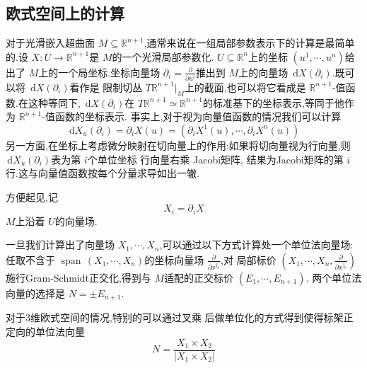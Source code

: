 \documentclass[../../几何与拓扑.tex]{subfiles}
\begin{document}
\subsection{欧式空间上的计算}


对于光滑嵌入超曲面 \(  M\subseteq \mathbb{R} ^{n+ 1}  \),通常来说在一组局部参数表示下的计算是最简单的.设 \(  X:U\to \mathbb{R} ^{n+ 1}  \)是 \(  M  \)的一个光滑局部参数化.  \(  U\subseteq \mathbb{R} ^{n}  \)上的坐标 \(  \left(  u^1,\cdots,u^n  \right)   \)给出了 \(  M  \)上的一个局坐标.坐标向量场 \(   \partial _{i}= \frac{\partial }{\partial u^{i}}  \)推出到 \(  M  \)上的向量场 \(  \,\mathrm{d} X\left(  \partial _{i} \right)   \).既可以将 \(  \,\mathrm{d} X\left(  \partial _{i} \right)   \)看作是 限制切丛 \(  T\mathbb{R} ^{n+ 1}|_{M}  \)上的截面,也可以将它看成是 \(  \mathbb{R} ^{n+ 1}  \)-值函数.在这种等同下, \(  \,\mathrm{d} X\left(  \partial _{i} \right)   \)在 \(  T\mathbb{R} ^{n+ 1}\simeq \mathbb{R} ^{n+ 1}  \)的标准基下的坐标表示,等同于他作为 \(  \mathbb{R} ^{n+ 1}  \)-值函数的坐标表示.  事实上,对于视为向量值函数的情况我们可以计算 \[
\,\mathrm{d} X_{u}\left(  \partial _{i} \right)=   \partial _{i}X\left( u \right)= \left(  \partial _{i}X^{1}\left( u \right),\cdots , \partial _{i}X^{n}\left( u \right)   \right)   
\]      
另一方面,在坐标上考虑微分映射在切向量上的作用:如果将切向量视为行向量,则 \(  \,\mathrm{d} X_{u}\left(  \partial _{i} \right)   \)表为第 \(  i  \)个单位坐标 行向量右乘 Jacobi矩阵, 结果为Jacobi矩阵的第 \(  i  \)行.这与向量值函数按每个分量求导如出一辙.
\begin{definition}
    方便起见,记 \[
    X_{i}=  \partial _{i}X
    \] \(  M  \)上沿着 \(  U  \)的向量场.  
\end{definition}

一旦我们计算出了向量场 \(   X_1,\cdots,X_n   \),可以通过以下方式计算处一个单位法向量场: 任取不含于 \(  \operatorname{span}\,\left(  X_1,\cdots,X_n  \right)   \)的坐标向量场 \(  \frac{\partial }{\partial x^{j_0}}  \),对 局部标价 \(  \left(  X_1,\cdots,X_n , \frac{\partial }{\partial x^{j_0}} \right)   \)施行Gram-Schmidt正交化,得到与 \(  M  \)适配的正交标价 \(  \left(  E_1,\cdots,E_{n+ 1}  \right)   \). 两个单位法向量的选择是 \(  N= \pm E_{n+ 1}  \).

对于3维欧式空间的情况,特别的可以通过叉乘 后做单位化的方式得到使得标架正定向的单位法向量 \[
N =  \frac{X_1\times X_2 }{\left| X_1\times X_2 \right|  } 
\]
\end{document}
